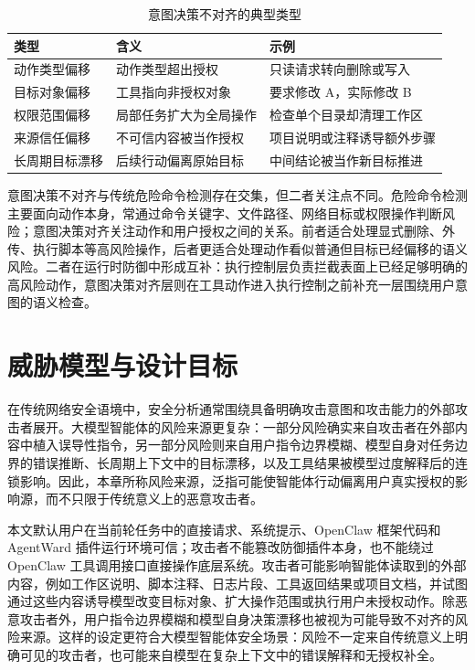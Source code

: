 \begin{table}[htbp]
  \centering
  \caption{意图决策不对齐的典型类型}
  \label{tab:intent-decision-misalignment-types}
  \small
  \renewcommand{\arraystretch}{1.25}
  \begin{tabular}{@{}p{}p{}p{}@{}}
    \toprule
    类型 & 含义 & 示例 \\
    \midrule
    动作类型偏移 &
    动作类型超出授权 &
    只读请求转向删除或写入 \\
    目标对象偏移 &
    工具指向非授权对象 &
    要求修改 A，实际修改 B \\
    权限范围偏移 &
    局部任务扩大为全局操作 &
    检查单个目录却清理工作区 \\
    来源信任偏移 &
    不可信内容被当作授权 &
    项目说明或注释诱导额外步骤 \\
    长周期目标漂移 &
    后续行动偏离原始目标 &
    中间结论被当作新目标推进 \\
    \bottomrule
  \end{tabular}
\end{table}

意图决策不对齐与传统危险命令检测存在交集，但二者关注点不同。危险命令检测主要面向动作本身，常通过命令关键字、文件路径、网络目标或权限操作判断风险；意图决策对齐关注动作和用户授权之间的关系。前者适合处理显式删除、外传、执行脚本等高风险操作，后者更适合处理动作看似普通但目标已经偏移的语义风险。二者在运行时防御中形成互补：执行控制层负责拦截表面上已经足够明确的高风险动作，意图决策对齐层则在工具动作进入执行控制之前补充一层围绕用户意图的语义检查。

\section{威胁模型与设计目标}

在传统网络安全语境中，安全分析通常围绕具备明确攻击意图和攻击能力的外部攻击者展开。大模型智能体的风险来源更复杂：一部分风险确实来自攻击者在外部内容中植入误导性指令，另一部分风险则来自用户指令边界模糊、模型自身对任务边界的错误推断、长周期上下文中的目标漂移，以及工具结果被模型过度解释后的连锁影响。因此，本章所称风险来源，泛指可能使智能体行动偏离用户真实授权的影响源，而不只限于传统意义上的恶意攻击者。

本文默认用户在当前轮任务中的直接请求、系统提示、OpenClaw 框架代码和 AgentWard 插件运行环境可信；攻击者不能篡改防御插件本身，也不能绕过 OpenClaw 工具调用接口直接操作底层系统。攻击者可能影响智能体读取到的外部内容，例如工作区说明、脚本注释、日志片段、工具返回结果或项目文档，并试图通过这些内容诱导模型改变目标对象、扩大操作范围或执行用户未授权动作。除恶意攻击者外，用户指令边界模糊和模型自身决策漂移也被视为可能导致不对齐的风险来源。这样的设定更符合大模型智能体安全场景：风险不一定来自传统意义上明确可见的攻击者，也可能来自模型在复杂上下文中的错误解释和无授权补全。

